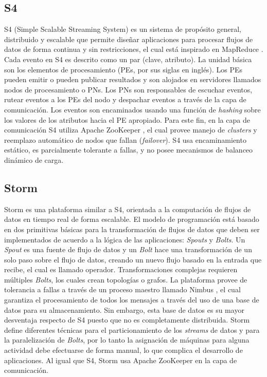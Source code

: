 \subsection{S4}
S4 (Simple Scalable Streaming System) \citep{s4yahoo} es un sistema de propósito general, distribuido y escalable que permite diseñar aplicaciones para procesar flujos de datos de forma continua y sin restricciones, el cual está inspirado en MapReduce \citep{2010Lin}. Cada evento en S4 es descrito como un par (clave, atributo). La unidad básica son los elementos de procesamiento (PEs, por sus siglas en inglés). Los PEs pueden emitir o pueden publicar resultados y son alojados en servidores llamados nodos de procesamiento o PNs. Los PNs son responsables de escuchar eventos, rutear eventos a los PEs del nodo y despachar eventos a través de la capa de comunicación. Los eventos son encaminados usando una función de \textsl{hashing} sobre los valores de los atributos hacia el PE apropiado. Para este fin, en la capa de comunicación S4 utiliza Apache ZooKeeper \citep{HuntKJR10}, el cual provee manejo de \textit{clusters} y reemplazo automático de nodos que fallan \normalsize{(\textit{failover})}. S4 usa encaminamiento estático, es parcialmente tolerante a fallas, y no posee mecanismos de balanceo dinámico de carga.

\subsection{Storm}
Storm \citep{bookstorm} es una plataforma similar a S4, orientada a la computación de flujos de datos en tiempo real de forma escalable. El modelo de programación está basado en dos primitivas básicas para la transformación de flujos de datos que deben ser implementados de acuerdo a la lógica de las aplicaciones: \textit{Spouts} y \textit{Bolts}. Un \textit{Spout} es una fuente de flujo de datos y un \textit{Bolt} hace una transformación de un solo paso sobre el flujo de datos, creando un nuevo flujo basado en la entrada que recibe, el cual es llamado operador. Transformaciones complejas requieren múltiples \textit{Bolts}, los cuales crean topologías o grafos. La plataforma provee de tolerancia a fallas a través de un proceso maestro llamado Nimbus \citep{MiaoYJ14}, el cual garantiza el procesamiento de todos los mensajes a través del uso de una base de datos para su almacenamiento. Sin embargo, esta base de datos es su mayor desventaja respecto de S4 puesto que no es completamente distribuida. Storm define diferentes técnicas para el particionamiento de los \textit{streams} de datos y para la paralelización de \textit{Bolts}, por lo tanto la asignación de máquinas para alguna actividad debe efectuarse de forma manual, lo que complica el desarrollo de aplicaciones. Al igual que S4, Storm usa Apache ZooKeeper \citep{HuntKJR10} en la capa de comunicación.

